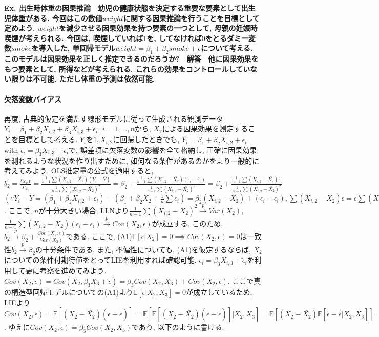 \documentclass[paper=a4paper,fontsize=10pt]{jlreq}
\begin{document}
\rmfamily\mcfamily\bfseries{Ex. 出生時体重の因果推論}\mdseries　幼児の健康状態を決定する重要な要素として出生児体重がある. 今回はこの数値$weight$に関する因果推論を行うことを目標として定めよう. $weight$を減少させる因果効果を持つ要素の一つとして, 母親の妊娠時喫煙が考えられる. 今回は, 喫煙していれば$1$を, してなければ$0$をとるダミー変数$smoke$を導入した, 単回帰モデル$weight = \beta_1 + \beta_2 smoke + \epsilon$について考える. このモデルは因果効果を正しく推定できるのだろうか?　\rmfamily\mcfamily\bfseries{解答}\mdseries　他に因果効果をもつ要素として, 所得などが考えられる. これらの効果をコントロールしていない限りは不可能. ただし体重の予測は依然可能. \\

\paragraph{欠落変数バイアス}
再度, 古典的仮定を満たす線形モデルに従って生成される観測データ$Y_i=\beta_1+\beta_2X_{i,2}+\beta_3X_{i,3}+\tilde{\epsilon}_i$, $i=1,\dots,n$から, $X_2$による因果効果を測定することを目標として考える. $Y_i$を$1, X_{i,2}$に回帰したときでも, $Y_i=\beta_1+\beta_2X_{i,2}+\epsilon_i$ with $\epsilon_i=\beta_3X_{i,3}+\tilde{\epsilon}_i$で, 誤差項に欠落変数の影響を全て格納し, 正確に因果効果を測れるような状況を作り出すために, 如何なる条件があるのかをより一般的に考えてみよう. OLS推定量の公式を適用すると, $b_2^\prime =\frac{s_{X_2,Y}}{s_{X_2}^2}=\frac{\frac{1}{n-1}\sum{(X_{i,2}-\bar{X_{2}})(Y_{i}-\bar{Y})}}{\frac{1}{n-1}\sum{(X_{i,2}-\bar{X_{2}})^2}}=\beta_2+\frac{\frac{1}{n-1}\sum{(X_{i,2}-\bar{X_{2}})(\epsilon_i-\bar{\epsilon_i})}}{\frac{1}{n-1}\sum{(X_{i,2}-\bar{X_{2}})^2}}=\beta_2+\frac{\frac{1}{n-1}\sum{(X_{i,2}-\bar{X_{2}})\epsilon_i}}{\frac{1}{n-1}\sum{(X_{i,2}-\bar{X_{2}})^2}}$ $(\because Y_{i}-\bar{Y}=(\beta_1+\beta_2X_{i,2}+\epsilon_i)-(\beta_1+{\beta_2}\bar{X_{2}}+\frac{1}{n}\sum{\epsilon_i})={\beta_2}(X_{i,2}-\bar{X_{2}})+(\epsilon_i-\bar{\epsilon_i}), \sum{(X_{i,2}-\bar{X_{2}})\bar{\epsilon}}=\bar{\epsilon}\sum{(X_{i,2}-\bar{X_{2}})}=0)$. ここで, $n$が十分大きい場合, LLNより$\frac{1}{n-1}\sum{(X_{i,2}-\bar{X_{2}})^2} \overset{p}{\to} Var(X_2)$, $\frac{1}{n-1}\sum{(X_{i,2}-\bar{X_{2}})(\epsilon_i-\bar{\epsilon_i})} \overset{p}{\to} Cov(X_2, \epsilon)$が成立する. このため, $b_2^\prime \overset{p}{\to} \beta_2+\frac{Cov(X_2, \epsilon)}{Var(X_2)}$である. ここで, (A1)$\mathbb{E}[\epsilon | X_{2}]=0 \implies Cov(X_2, \epsilon) = 0$は一致性$b_2^\prime \overset{p}{\to} \beta_2$の十分条件である. また, 不偏性についても, (A1)を仮定するならば, $X_{2}$についての条件付期待値をとってLIEを利用すれば確認可能. $\epsilon_i=\beta_3X_{i,3}+\tilde{\epsilon}_i$を利用して更に考察を進めてみよう. $Cov(X_2, \epsilon)=Cov(X_2, \beta_3X_{3}+\tilde{\epsilon})=\beta_3Cov(X_2, X_{3})+Cov(X_2, \tilde{\epsilon})$. ここで真の構造型回帰モデルについての(A1)より$\mathbb{E}[\tilde{\epsilon} | X_{2}, X_{3}]=0$が成立しているため, LIEより$Cov(X_2, \tilde{\epsilon})=\mathbb{E}[(X_2-\bar{X_2})(\tilde{\epsilon}-\bar{\tilde{\epsilon}})]=\mathbb{E}[\mathbb{E}[(X_2-\bar{X_2})(\tilde{\epsilon}-\bar{\tilde{\epsilon}})]|X_{2}, X_{3}]=\mathbb{E}[(X_2-\bar{X_2})\mathbb{E}[\tilde{\epsilon}-\bar{\tilde{\epsilon}}|X_{2}, X_{3}]]=0$. ゆえに$Cov(X_2, \epsilon)=\beta_3Cov(X_2, X_{3})$であり, 以下のように書ける.
\end{document}
